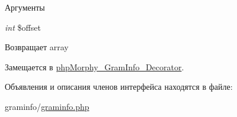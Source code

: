 \begin{DoxyParams}{Аргументы}
\item[{\em int}]\$offset \end{DoxyParams}
\begin{DoxyReturn}{Возвращает}
array 
\end{DoxyReturn}


Замещается в \hyperlink{classphpMorphy__GramInfo__Decorator_a0b3f846da88a8e3f7f6b81ece61067ed}{phpMorphy\_\-GramInfo\_\-Decorator}.



Объявления и описания членов интерфейса находятся в файле:\begin{DoxyCompactItemize}
\item 
graminfo/\hyperlink{graminfo_8php}{graminfo.php}\end{DoxyCompactItemize}
